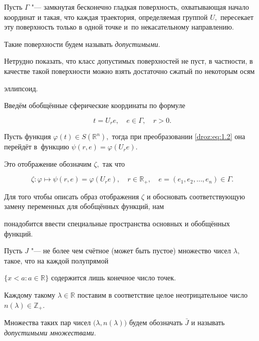 Пусть $\Gamma$ "--- замкнутая бесконечно гладкая поверхность, охватывающая начало координат и такая, что каждая траектория, определяемая группой $U,$ пересекает эту поверхность только в одной точке и~по некасательному направлению. 

Такие поверхности будем называть {\it допустимыми\/}. 

Нетрудно показать, что класс допустимых поверхностей не пуст, в частности, в качестве такой поверхности можно взять достаточно сжатый по некоторым осям

эллипсоид. 

Введём обобщённые сферические координаты по формуле 

\begin{equation}

t=U_re,\quad e\in \Gamma, \quad  r>0.

\label{droz:eq:1.2}

\end{equation}

Пусть функция $\varphi(t) \in S(\mathbb R^n),$ тогда при преобразовании \eqref{droz:eq:1.2} она перейдёт в~функцию $\psi(r,e)=\varphi(U_re)$.

Это отображение обозначим $\zeta,$ так что

\begin{equation}

\zeta:\varphi \mapsto  \psi(r,e)=\varphi(U_re),\quad r\in

\mathbb R_{+},\quad e=(e_1, e_2, \dots,e_n) \in {\Gamma}.

\label{droz:eq:1.3}

\end{equation}

Для того чтобы описать образ отображения $\zeta$ и обосновать соответствующую замену переменных для обобщённых функций, нам

понадобится ввести специальные пространства основных и обобщённых функций.



Пусть $J$ "--- не более чем счётное (может быть пустое) множество чисел $\lambda,$ такое, что на каждой полупрямой

$\{ x < a:  a \in \mathbb R \}$ содержится лишь конечное число точек. 

Каждому такому $\lambda \in \mathbb R$ поставим в соответствие целое неотрицательное число $n(\lambda) \in \mathbb Z_{+}.$ 

Множества таких пар чисел $\bigl(\lambda,n(\lambda)\bigr)$ будем обозначать $\bar{J}$ и называть {\it допустимыми множествами\/}.

